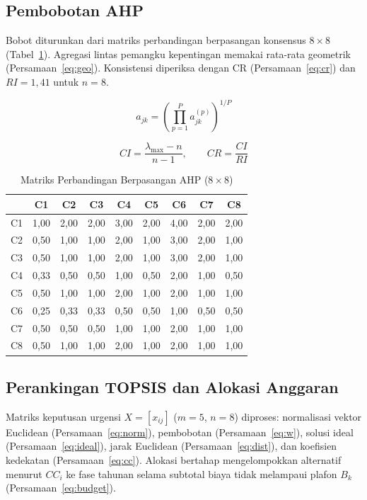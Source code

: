\documentclass[10pt,twocolumn,a4paper]{article}
\begin{document}
\subsection{Pembobotan AHP}
Bobot diturunkan dari matriks perbandingan berpasangan konsensus $8\times8$ (Tabel~\ref{tab:ahp}). Agregasi lintas pemangku kepentingan memakai rata-rata geometrik (Persamaan~\ref{eq:geo}). Konsistensi diperiksa dengan CR (Persamaan~\ref{eq:cr}) dan $RI=1{,}41$ untuk $n=8$.

\begin{equation}
a_{jk}=\left(\prod_{p=1}^{P} a_{jk}^{(p)}\right)^{1/P}
\label{eq:geo}
\end{equation}

\begin{equation}
CI=\frac{\lambda_{\max}-n}{n-1},\qquad CR=\frac{CI}{RI}
\label{eq:cr}
\end{equation}

\begin{table}[t]
\caption{Matriks Perbandingan Berpasangan AHP ($8\times8$)}
\label{tab:ahp}
\centering
\footnotesize
\begin{tabular}{@{}l cccccccc@{}}
\toprule
 & C1 & C2 & C3 & C4 & C5 & C6 & C7 & C8 \\
\midrule
C1 & 1,00 & 2,00 & 2,00 & 3,00 & 2,00 & 4,00 & 2,00 & 2,00 \\
C2 & 0,50 & 1,00 & 1,00 & 2,00 & 1,00 & 3,00 & 2,00 & 1,00 \\
C3 & 0,50 & 1,00 & 1,00 & 2,00 & 1,00 & 3,00 & 2,00 & 1,00 \\
C4 & 0,33 & 0,50 & 0,50 & 1,00 & 0,50 & 2,00 & 1,00 & 0,50 \\
C5 & 0,50 & 1,00 & 1,00 & 2,00 & 1,00 & 2,00 & 1,00 & 1,00 \\
C6 & 0,25 & 0,33 & 0,33 & 0,50 & 0,50 & 1,00 & 0,50 & 0,50 \\
C7 & 0,50 & 0,50 & 0,50 & 1,00 & 1,00 & 2,00 & 1,00 & 1,00 \\
C8 & 0,50 & 1,00 & 1,00 & 2,00 & 1,00 & 2,00 & 1,00 & 1,00 \\
\bottomrule
\end{tabular}
\end{table}

\subsection{Perankingan TOPSIS dan Alokasi Anggaran}
Matriks keputusan urgensi $X=[x_{ij}]$ ($m=5$, $n=8$) diproses: normalisasi vektor Euclidean (Persamaan~\ref{eq:norm}), pembobotan (Persamaan~\ref{eq:w}), solusi ideal (Persamaan~\ref{eq:ideal}), jarak Euclidean (Persamaan~\ref{eq:dist}), dan koefisien kedekatan (Persamaan~\ref{eq:cc}). Alokasi bertahap mengelompokkan alternatif menurut $CC_i$ ke fase tahunan selama subtotal biaya tidak melampaui plafon $B_k$ (Persamaan~\ref{eq:budget}).
\end{document}
